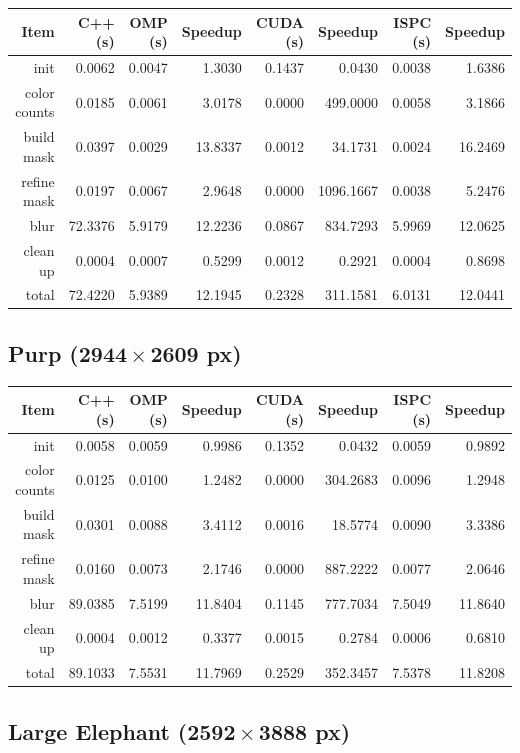 \documentclass[12pt]{article}
\begin{document}
\begin{tabular}{r|r|r|r|r|r|r|r}
    Item & C++ (s) & OMP (s) & Speedup & CUDA (s) & Speedup & ISPC (s) & Speedup
\\  \hline
    init & 0.0062 & 0.0047 & 1.3030 & 0.1437 & 0.0430 & 0.0038 & 1.6386
\\  color counts & 0.0185 & 0.0061 & 3.0178 & 0.0000 & 499.0000 & 0.0058 & 3.1866
\\  build mask & 0.0397 & 0.0029 & 13.8337 & 0.0012 & 34.1731 & 0.0024 & 16.2469
\\  refine mask & 0.0197 & 0.0067 & 2.9648 & 0.0000 & 1096.1667 & 0.0038 & 5.2476
\\  blur & 72.3376 & 5.9179 & 12.2236 & 0.0867 & 834.7293 & 5.9969 & 12.0625
\\  clean up & 0.0004 & 0.0007 & 0.5299 & 0.0012 & 0.2921 & 0.0004 & 0.8698
\\  \hline
    total & 72.4220 & 5.9389 & 12.1945 & 0.2328 & 311.1581 & 6.0131 & 12.0441
\end{tabular}

\subsection{Purp ($\mathbf{2944 \times 2609}$ px)}

\begin{tabular}{r|r|r|r|r|r|r|r}
    Item & C++ (s) & OMP (s) & Speedup & CUDA (s) & Speedup & ISPC (s) & Speedup
\\  \hline
    init & 0.0058 & 0.0059 & 0.9986 & 0.1352 & 0.0432 & 0.0059 & 0.9892
\\  color counts & 0.0125 & 0.0100 & 1.2482 & 0.0000 & 304.2683 & 0.0096 & 1.2948
\\  build mask & 0.0301 & 0.0088 & 3.4112 & 0.0016 & 18.5774 & 0.0090 & 3.3386
\\  refine mask & 0.0160 & 0.0073 & 2.1746 & 0.0000 & 887.2222 & 0.0077 & 2.0646
\\  blur & 89.0385 & 7.5199 & 11.8404 & 0.1145 & 777.7034 & 7.5049 & 11.8640
\\  clean up & 0.0004 & 0.0012 & 0.3377 & 0.0015 & 0.2784 & 0.0006 & 0.6810
\\  \hline
    total & 89.1033 & 7.5531 & 11.7969 & 0.2529 & 352.3457 & 7.5378 & 11.8208
\end{tabular}

\subsection{Large Elephant ($\mathbf{2592 \times 3888}$ px)}
\end{document}

